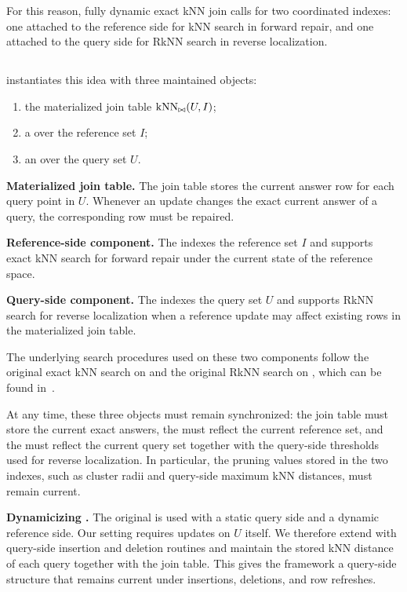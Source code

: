 For this reason, fully dynamic exact kNN join calls for two coordinated indexes: one attached to the reference side for kNN search in forward repair, and one attached to the query side for RkNN search in reverse localization.

\subsection{\dualtree}
\label{subsec:dualtree}

\dualtree instantiates this idea with three maintained objects:
\begin{enumerate}
    \item the materialized join table $\operatorname{kNN}_{\bowtie}(U,I)$;
    \item a \deltatree over the reference set $I$;
    \item an \hdrtree over the query set $U$.
\end{enumerate}

\noindent\textbf{Materialized join table.}
The join table stores the current answer row for each query point in $U$. Whenever an update changes the exact current answer of a query, the corresponding row must be repaired.

\noindent\textbf{Reference-side component.}
The \deltatree indexes the reference set $I$ and supports exact kNN search for forward repair under the current state of the reference space.

\noindent\textbf{Query-side component.}
The \hdrtree indexes the query set $U$ and supports RkNN search for reverse localization when a reference update may affect existing rows in the materialized join table.

The underlying search procedures used on these two components follow the original exact kNN search on \deltatree and the original RkNN search on \hdrtree, which can be found in~\cite{cui2003contorting,yang2014continuous}.

At any time, these three objects must remain synchronized: the join table must store the current exact answers, the \deltatree must reflect the current reference set, and the \hdrtree must reflect the current query set together with the query-side thresholds used for reverse localization. In particular, the pruning values stored in the two indexes, such as cluster radii and query-side maximum kNN distances, must remain current.

\noindent\textbf{Dynamicizing \hdrtree.}
The original \hdrtree is used with a static query side and a dynamic reference side. Our setting requires updates on $U$ itself. We therefore extend \hdrtree with query-side insertion and deletion routines and maintain the stored kNN distance of each query together with the join table. This gives the framework a query-side structure that remains current under insertions, deletions, and row refreshes.


